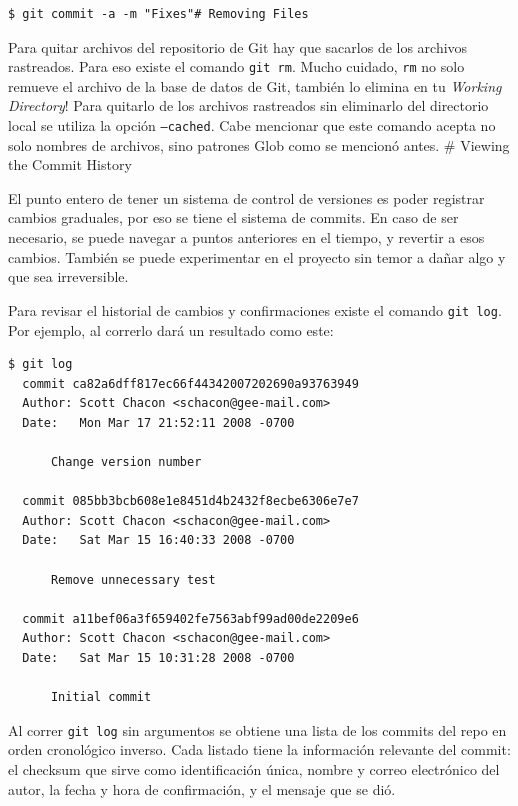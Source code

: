 \documentclass[spanish, 12pt, a4paper]{article}
\begin{document}
\begin{lstlisting}
$ git commit -a -m "Fixes"# Removing Files
\end{lstlisting}

Para quitar archivos del repositorio de Git hay que sacarlos de los
archivos rastreados. Para eso existe el comando
\passthrough{\lstinline!git rm!}. Mucho cuidado,
\passthrough{\lstinline!rm!} no solo remueve el archivo de la base de
datos de Git, también lo elimina en tu \emph{Working Directory}! Para
quitarlo de los archivos rastreados sin eliminarlo del directorio local
se utiliza la opción \passthrough{\lstinline!–cached!}. Cabe mencionar
que este comando acepta no solo nombres de archivos, sino patrones Glob
como se mencionó antes. \# Viewing the Commit History

El punto entero de tener un sistema de control de versiones es poder
registrar cambios graduales, por eso se tiene el sistema de commits. En
caso de ser necesario, se puede navegar a puntos anteriores en el
tiempo, y revertir a esos cambios. También se puede experimentar en el
proyecto sin temor a dañar algo y que sea irreversible.

Para revisar el historial de cambios y confirmaciones existe el comando
\passthrough{\lstinline!git log!}. Por ejemplo, al correrlo dará un
resultado como este:

\begin{lstlisting}
$ git log
  commit ca82a6dff817ec66f44342007202690a93763949
  Author: Scott Chacon <schacon@gee-mail.com>
  Date:   Mon Mar 17 21:52:11 2008 -0700

      Change version number

  commit 085bb3bcb608e1e8451d4b2432f8ecbe6306e7e7
  Author: Scott Chacon <schacon@gee-mail.com>
  Date:   Sat Mar 15 16:40:33 2008 -0700

      Remove unnecessary test

  commit a11bef06a3f659402fe7563abf99ad00de2209e6
  Author: Scott Chacon <schacon@gee-mail.com>
  Date:   Sat Mar 15 10:31:28 2008 -0700

      Initial commit
\end{lstlisting}

Al correr \passthrough{\lstinline!git log!} sin argumentos se obtiene
una lista de los commits del repo en orden cronológico inverso. Cada
listado tiene la información relevante del commit: el checksum que sirve
como identificación única, nombre y correo electrónico del autor, la
fecha y hora de confirmación, y el mensaje que se dió.
\end{document}
